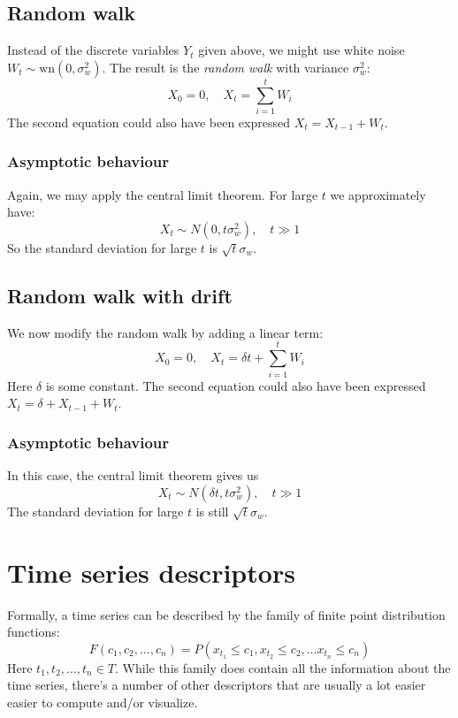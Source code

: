 \documentclass[12pt, a4paper]{article}
\numberwithin{equation}{section}
\begin{document}
\subsection{Random walk}
Instead of the discrete variables $Y_t$ given above, we might use white noise $W_t\sim\textrm{wn}(0,\sigma_w^2)$. The result is the \textit{random walk} with variance $\sigma_w^2$:
\begin{equation}
X_0=0,\quad X_t=\sum_{i=1}^t W_i
\end{equation}
The second equation could also have been expressed $X_t=X_{t-1}+W_t$.

\subsubsection{Asymptotic behaviour}
Again, we may apply the central limit theorem. For large $t$ we approximately have:
\begin{equation}
X_t\sim N(0,t\sigma_w^2),\quad t\gg 1
\end{equation}
So the standard deviation for large $t$ is $\sqrt{t}\sigma_w$.

\subsection{Random walk with drift}
We now modify the random walk by adding a linear term:
\begin{equation}
X_0=0,\quad X_t=\delta t+\sum_{i=1}^t W_i
\end{equation}
Here $\delta$ is some constant. The second equation could also have been expressed $X_t=\delta+X_{t-1}+W_t$.

\subsubsection{Asymptotic behaviour}
In this case, the central limit theorem gives us
\begin{equation}
X_t\sim N(\delta t,t\sigma_w^2),\quad t\gg 1
\end{equation}
The standard deviation for large $t$ is still $\sqrt{t}\sigma_w$.

\section{Time series descriptors}

Formally, a time series can be described by the family of finite point distribution functions:
\begin{equation}
\label{ts_distribution}
F(c_1,c_2,\ldots,c_n)=P(x_{t_1}\le c_1,x_{t_2}\le c_2,\ldots x_{t_n}\le c_n) 
\end{equation}
Here $t_1, t_2,\ldots,t_n\in T$. While this family does contain all the information about the time series, there's a number of other descriptors that are usually a lot easier easier to compute and/or visualize.
\end{document}
